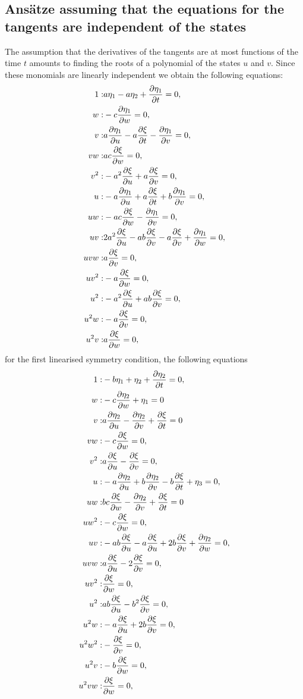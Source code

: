 \subsection{Ans\"atze assuming that the equations for the tangents are independent of the states}
The assumption that the derivatives of the tangents are at most functions of the time $t$ amounts to finding the roots of a polynomial of the states $u$ and $v$. Since these monomials are linearly independent we obtain the following equations:
\begin{align}
1:&a \eta_1 - a \eta_2 + \pdv{\eta_1}{t}=0,\\
w:&- c \pdv{\eta_1}{w}=0,\\
v:&a \pdv{\eta_1}{u} - a \pdv{\xi}{t} - \pdv{\eta_1}{v}=0,\\
v w:&a c \pdv{\xi}{w}=0,\\
v^{2}:&- a^{2} \pdv{\xi}{u} + a \pdv{\xi}{v}=0,\\
u:&- a \pdv{\eta_1}{u} + a \pdv{\xi}{t} + b \pdv{\eta_1}{v}=0,\\
u w:&- a c \pdv{\xi}{w} - \pdv{\eta_1}{v}=0,\\
u v:&2 a^{2} \pdv{\xi}{u} - a b \pdv{\xi}{v} - a \pdv{\xi}{v} + \pdv{\eta_1}{w}=0,\\
u v w:&a \pdv{\xi}{v}=0,\\
u v^{2}:&- a \pdv{\xi}{w}=0,\\
u^{2}:&- a^{2} \pdv{\xi}{u} + a b \pdv{\xi}{v}=0,\\
u^{2} w:&- a \pdv{\xi}{v}=0,\\
u^{2} v:&a \pdv{\xi}{w}=0,
\end{align}
for the first linearised symmetry condition, the following equations
\begin{align}
1:&- b \eta_1 + \eta_2 + \pdv{\eta_2}{t}=0,\\
w:&- c \pdv{\eta_2}{w} + \eta_1=0\\
v:&a \pdv{\eta_2}{u} - \pdv{\eta_2}{v} + \pdv{\xi}{t}=0\\
v w:&- c \pdv{\xi}{w}=0,\\
v^{2}:&a \pdv{\xi}{u} - \pdv{\xi}{v}=0,\\
u:&- a \pdv{\eta_2}{u} + b \pdv{\eta_2}{v} - b \pdv{\xi}{t} + \eta_3=0,\\
u w:&b c \pdv{\xi}{w} - \pdv{\eta_2}{v} + \pdv{\xi}{t}=0\\
u w^{2}:&- c \pdv{\xi}{w}=0,\\
u v:&- a b \pdv{\xi}{u} - a \pdv{\xi}{u} + 2 b \pdv{\xi}{v} + \pdv{\eta_2}{w}=0,\\
u v w:&a \pdv{\xi}{u} - 2 \pdv{\xi}{v}=0,\\
u v^{2}:&\pdv{\xi}{w}=0,\\
u^{2}:&a b \pdv{\xi}{u} - b^{2} \pdv{\xi}{v}=0,\\
u^{2} w:&- a \pdv{\xi}{u} + 2 b \pdv{\xi}{v}=0,\\
u^{2} w^{2}:&- \pdv{\xi}{v}=0,\\
u^{2} v:&- b \pdv{\xi}{w}=0,\\
u^{2} v w:&\pdv{\xi}{w}=0,
\end{align}
